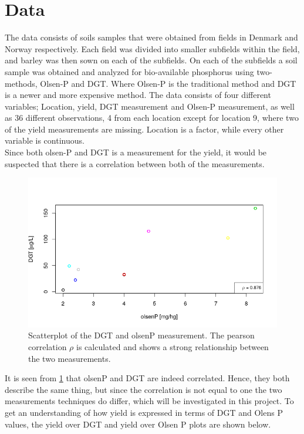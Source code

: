 \documentclass[11pt, fleqn, titlepage]{article}
\begin{document}
\section{Data}
\noindent
The data consists of soils samples that were obtained from fields in Denmark and Norway respectively. Each field was divided into smaller subfields within the field, and barley was then sown on each of the subfields. On each of the subfields a soil sample was obtained and analyzed for bio-available phosphorus using two-methods, Olsen-P and DGT. Where Olsen-P is the traditional method and DGT is a newer and more expensive method. The data consists of four different variables; Location, yield, DGT measurement and Olsen-P measurement, as well as 36 different observations, 4 from each location except for location 9, where two of the yield measurements are missing. Location is a factor, while every other variable is continuous.
\\ \noindent 
Since both olsen-P and DGT is a measurement for the yield, it would be suspected that there is a correlation between both of the measurements. 
\begin{figure}[H]
	\centering
	\includegraphics[width=0.7\linewidth]{billeder/dgtolsencor.png}
	\caption{Scatterplot of the DGT and olsenP measurement. The pearson correlation $ \rho $ is calculated and shows a strong relationship between the two measurements.}
	\label{fig:dgtolsencor}
\end{figure}
\noindent It is seen from \ref{fig:dgtolsencor} that olsenP and DGT are indeed correlated. Hence, they both describe the same thing, but since the correlation is not equal to one the two measurements techniques do differ, which will be investigated in this project. To get an understanding of how yield is expressed in terms of DGT and Olens P values, the yield over DGT and yield over Olsen P plots are shown below. 
\end{document}
